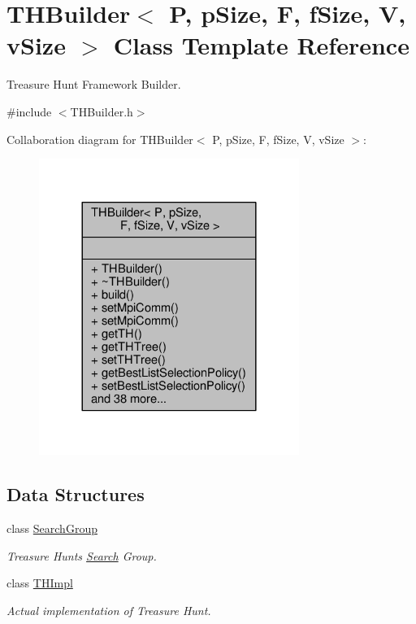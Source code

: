 \hypertarget{classTHBuilder}{}\section{T\+H\+Builder$<$ P, p\+Size, F, f\+Size, V, v\+Size $>$ Class Template Reference}
\label{classTHBuilder}


Treasure Hunt Framework Builder.  




{\ttfamily \#include $<$T\+H\+Builder.\+h$>$}



Collaboration diagram for T\+H\+Builder$<$ P, p\+Size, F, f\+Size, V, v\+Size $>$\+:\nopagebreak
\begin{figure}[H]
\begin{center}
\leavevmode
\includegraphics[width=240pt]{classTHBuilder__coll__graph}
\end{center}
\end{figure}
\subsection*{Data Structures}
\begin{DoxyCompactItemize}
\item 
class \hyperlink{classTHBuilder_1_1SearchGroup}{Search\+Group}
\begin{DoxyCompactList}\small\item\em Treasure Hunt\textquotesingle{}s \hyperlink{classSearch}{Search} Group. \end{DoxyCompactList}\item 
class \hyperlink{classTHBuilder_1_1THImpl}{T\+H\+Impl}
\begin{DoxyCompactList}\small\item\em Actual implementation of Treasure Hunt. \end{DoxyCompactList}\end{DoxyCompactItemize}
